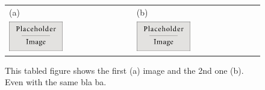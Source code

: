 \documentclass[draft, grl]{agutex}
\begin{document}

\newpage


\begin{figure}
	\begin{center}
	\begin{table}[H]
		\begin{tabular}{ p{} p{} }
		\footnotesize(a)
		& 
		\footnotesize(b)
		\\		
		\includegraphics[width=0.45\textwidth]{placeholder} &
		\includegraphics[width=0.45\textwidth]{placeholder}
		\end{tabular}
	\end{table}
	\caption{This tabled figure shows the first (a) image and the 2nd one (b). Even with the same bla ba.}
	\label{placeholder}
	\end{center}
\end{figure}
\end{document}
